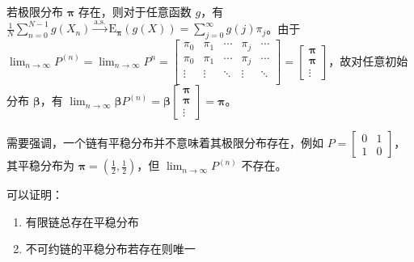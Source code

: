 \documentclass[../main.tex]{subfiles}
\begin{document}
若极限分布 $\boldsymbol\pi$ 存在，则对于任意函数 $g$，有 $\frac1N\sum_{n=0}^{N-1}g(X_n)\overset{\mathrm{a.s.}}\rightarrow\mathrm E_{\boldsymbol\pi}(g(X))=\sum_{j=0}^\infty g(j)\pi_j$。由于 $\lim_{n\rightarrow\infty}P^{(n)}=\lim_{n\rightarrow\infty}P^n=
    \left[\begin{matrix}
            \pi_0  & \pi_1  & \cdots & \pi_j  & \cdots \\
            \pi_0  & \pi_1  & \cdots & \pi_j  & \cdots \\
            \vdots & \vdots & \ddots & \vdots & \ddots \\
        \end{matrix}\right]=
    \left[\begin{matrix}
            \boldsymbol\pi \\
            \boldsymbol\pi \\
            \vdots
        \end{matrix}\right]$，故对任意初始分布 $\boldsymbol\beta$，有 $\lim_{n\rightarrow\infty}\boldsymbol\beta P^{(n)}=\boldsymbol\beta\left[\begin{matrix}
            \boldsymbol\pi \\
            \boldsymbol\pi \\
            \vdots
        \end{matrix}\right]=\boldsymbol\pi$。

需要强调，一个链有平稳分布并不意味着其极限分布存在，例如 $P=
    \left[\begin{matrix}
            0 & 1 \\
            1 & 0
        \end{matrix}\right]$，其平稳分布为 $\boldsymbol\pi=(\frac12,\frac12)$，但 $\lim_{n\rightarrow\infty}P^{(n)}$ 不存在。

可以证明：
\begin{enumerate}
    \item 有限链总存在平稳分布
    \item 不可约链的平稳分布若存在则唯一
\end{enumerate}
\end{document}
